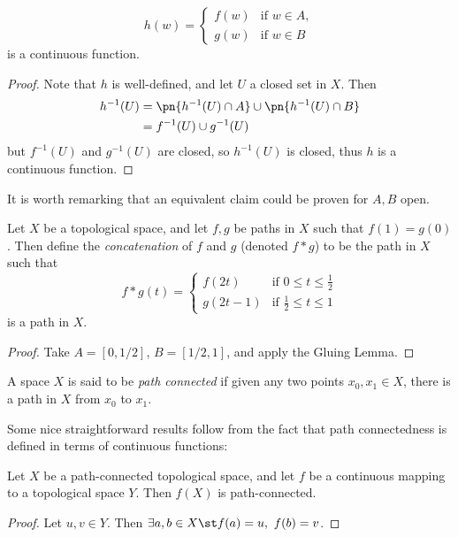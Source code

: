 \documentclass{fkbook}
\begin{document}
\begin{adjustwidth}{1em}{1em}
\begin{lemma}
    \[
      h(w) =
      \begin{cases}
        f(w) & \text{if } w \in A, \\
        g(w) & \text{if } w \in B
      \end{cases}
    \]
    is a continuous function.
  \end{lemma}
  \begin{proof}
    Note that $h$ is well-defined, and let $U$ a closed set in $X$.
    Then
    \begin{align*}
      h^{-1}(U)
      &= \pn{h^{-1}(U) \cap A} \cup \pn{h^{-1}(U) \cap B} \\
      &= f^{-1}(U) \cup g^{-1}(U)
    \end{align*}
    but $f^{-1}(U)$ and $g^{-1}(U)$ are closed, so $h^{-1}(U)$ is
    closed, thus $h$ is a continuous function.
  \end{proof}
  It is worth remarking that an equivalent claim could be proven for
  $A,B$ open.
  \begin{lemma}
    Let $X$ be a topological space, and let $f,g$ be paths in $X$ such
    that $f(1) = g(0)$. Then define the \emph{concatenation} of $f$
    and $g$ (denoted $f * g$) to be the path in $X$ such that
    \[
      f * g (t) =
      \begin{cases}
        f(2t) & \text{if } 0 \leq t \leq \frac{1}{2} \\
        g(2t - 1) & \text{if } \frac{1}{2} \leq t \leq 1
      \end{cases}
    \]
    is a path in $X$.
  \end{lemma}
  \begin{proof}
    Take $A = [0,1/2]$, $B = [1/2, 1]$, and apply the Gluing Lemma.
  \end{proof}
  \begin{definition}
    A space $X$ is said to be \emph{path connected} if given any two
    points $x_0, x_1 \in X$, there is a path in $X$ from $x_0$ to
    $x_1$.
  \end{definition}
  Some nice straightforward results follow from the fact that path
  connectedness is defined in terms of continuous functions:
  \begin{theorem}
    Let $X$ be a path-connected topological space, and let $f$ be a
    continuous mapping to a topological space $Y$. Then $f(X)$ is
    path-connected.
  \end{theorem}
  \begin{proof}
    Let $u,v \in Y$. Then $\exists a,b \in X \st f(a) = u,\ f(b) = v$.

\end{proof}
\end{adjustwidth}
\end{document}
